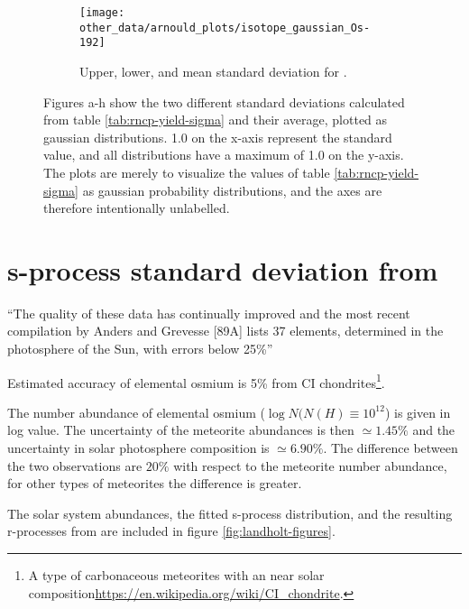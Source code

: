 \begin{figure}
\begin{subfigure}{\subfiglength}
  \end{subfigure}
  \begin{subfigure}{\subfiglength}
    \centering
    \texttt{[image: other\_data/arnould\_plots/isotope\_gaussian\_Os-192]}
    \caption{Upper, lower, and mean standard deviation for .}
  \end{subfigure}
  \caption{\label{fig:arnould-gauss-dist}
    Figures a-h show the two different standard deviations calculated from table \ref{tab:rncp-yield-sigma} and their average, plotted as gaussian distributions.
    1.0 on the x-axis represent the standard value, and all distributions have a maximum of 1.0 on the y-axis.
    The plots are merely to visualize the values of table \ref{tab:rncp-yield-sigma} as gaussian probability distributions, and the axes are therefore intentionally unlabelled.
  }
\end{figure}
\FloatBarrier

\section{s-process standard deviation from \cite{landolt93}}
``The quality of these data has continually improved and the most recent compilation by
Anders and Grevesse [89A] lists 37 elements, determined in the photosphere of the Sun, with errors below
25\%''\cite[p.197]{landolt93}

Estimated accuracy of elemental osmium is 5\% from CI chondrites\footnote{A type of carbonaceous meteorites with an near solar composition\url{https://en.wikipedia.org/wiki/CI_chondrite}.}\cite[table2, p.203]{landolt93}.

The number abundance of elemental osmium ($\log N(N(H)\equiv 10^{12}$) is given in log value. The uncertainty of the meteorite abundances is then $\simeq 1.45\%$ and the uncertainty in solar photosphere composition is $\simeq 6.90\%$. The difference between the two observations are $20\%$ with respect to the meteorite number abundance\cite[table3, p.205]{landolt93}, for other types of meteorites the difference is greater.

The solar system abundances, the fitted s-process distribution, and the resulting r-processes from \cite{landolt93} are included in figure \ref{fig:landholt-figures}.

